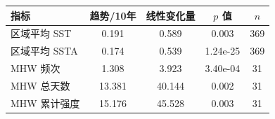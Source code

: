 \begin{tabular}{lcccc}
\hline
指标 & 趋势/10年 & 线性变化量 & $p$ 值 & $n$ \\
\hline
区域平均 SST & 0.191 & 0.589 & 0.003 & 369 \\
区域平均 SSTA & 0.174 & 0.539 & 1.24e-25 & 369 \\
MHW 频次 & 1.308 & 3.923 & 3.40e-04 & 31 \\
MHW 总天数 & 13.381 & 40.144 & 0.002 & 31 \\
MHW 累计强度 & 15.176 & 45.528 & 0.003 & 31 \\
\hline
\end{tabular}
